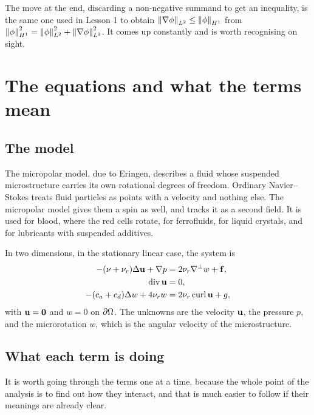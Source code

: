 \documentclass[11pt,a4paper]{article}
\begin{document}
\begin{remark}
The move at the end, discarding a non-negative summand to get an inequality, is
the same one used in Lesson 1 to obtain $\left\lVert \nabla \phi \right\rVert_{L^{2}} \le \left\lVert \phi \right\rVert_{H^{1}}$
from $\left\lVert \phi \right\rVert_{H^{1}}^{2} = \left\lVert \phi \right\rVert_{L^{2}}^{2} + \left\lVert \nabla \phi \right\rVert_{L^{2}}^{2}$. It comes up
constantly and is worth recognising on sight.
\end{remark}

\section{The equations and what the terms mean}

\subsection{The model}

The micropolar model, due to Eringen, describes a fluid whose suspended
microstructure carries its own rotational degrees of freedom. Ordinary
Navier--Stokes treats fluid particles as points with a velocity and nothing
else. The micropolar model gives them a spin as well, and tracks it as a second
field. It is used for blood, where the red cells rotate, for ferrofluids, for
liquid crystals, and for lubricants with suspended additives.

In two dimensions, in the stationary linear case, the system is
\begin{align}
  -(\nu + \nu_{r}) \Delta \mathbf{u} + \nabla p
    &= 2\nu_{r} \nabla^{\perp} w + \mathbf{f} , \label{eq:mom} \\
  \operatorname{div} \mathbf{u} &= 0 , \label{eq:incomp} \\
  -(c_{a} + c_{d}) \Delta w + 4\nu_{r} w
    &= 2\nu_{r} \operatorname{curl} \mathbf{u} + g , \label{eq:micro}
\end{align}
with $\mathbf{u} = \mathbf{0}$ and $w = 0$ on $\partial\Omega$. The unknowns are the velocity
$\mathbf{u}$, the pressure $p$, and the microrotation $w$, which is the angular
velocity of the microstructure.

\subsection{What each term is doing}

It is worth going through the terms one at a time, because the whole point of
the analysis is to find out how they interact, and that is much easier to follow
if their meanings are already clear.
\end{document}
